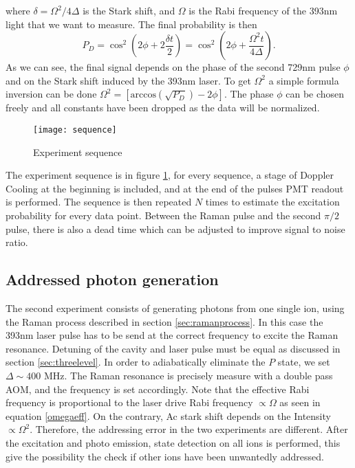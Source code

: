 where $\delta = \Omega^2/4\Delta$ is the Stark shift, and $\Omega$ is the Rabi frequency of the 393nm light that we want to measure. The final probability is then
\begin{equation}
P_D = \cos^2\left(2\phi + 2\frac{\delta t}{2}\right) = \cos^2\left(2\phi + \frac{\Omega^2 t}{4\Delta}\right).
\end{equation}
As we can see, the final signal depends on the phase of the second 729nm pulse $\phi$ and on the Stark shift induced by the 393nm laser. To get $\Omega^2$ a simple formula inversion can be done $\Omega^2 = \left[\text{arccos}\left(\sqrt{P_D}\right)-2\phi \right]$. The phase $\phi$ can be chosen freely and all constants have been dropped as the data will be normalized.\\
\begin{figure}
\centering
\texttt{[image: sequence]}
\caption{Experiment sequence}
\label{sequence}
\end{figure}
The experiment sequence is in figure \ref{sequence}, for every sequence, a stage of Doppler Cooling at the beginning is included, and at the end of the pulses PMT readout is performed. The sequence is then repeated $N$ times to estimate the excitation probability for every data point. Between the Raman pulse and the second $\pi/2$ pulse, there is also a dead time which can be adjusted to improve signal to noise ratio.\\

\subsection{Addressed photon generation}
The second experiment consists of generating photons from one single ion, using the Raman process described in section \ref{sec:ramanprocess}. In this case the 393nm laser pulse has to be send at the correct frequency to excite the Raman resonance. Detuning of the cavity and laser pulse must be equal as discussed in section \ref{sec:threelevel}. In order to adiabatically eliminate the $P$ state, we set $\Delta \sim 400$ MHz. The Raman resonance is precisely measure with a double pass AOM, and the frequency is set accordingly. Note that the effective Rabi frequency is proportional to the laser drive Rabi frequency $\propto \Omega$ as seen in equation \eqref{omegaeff}. On the contrary, Ac stark shift depends on the Intensity $\propto \Omega^2$. Therefore, the addressing error in the two experiments are different. After the excitation and photo emission, state detection on all ions is performed, this give the possibility the check if other ions have been unwantedly addressed.

